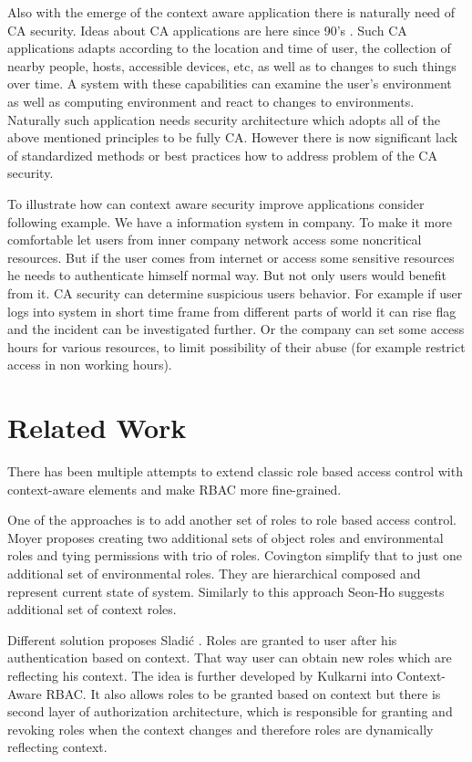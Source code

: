 \documentclass{poster15}
\begin{document}
Also with the emerge of the context aware application there is naturally need of CA security. Ideas about CA applications are here since 90's \cite{contextaware}. Such CA applications adapts according to the location and time of user, the collection of nearby people, hosts, accessible devices, etc, as well as to changes to such things over time. A system with these capabilities can examine the user's environment as well as computing environment and react to changes to environments. Naturally such application needs security architecture which adopts all of the above mentioned principles to be fully CA. However there is now significant lack of standardized methods or best practices how to address problem of the CA security.

To illustrate how can context aware security improve applications consider following example. We have a information system in company. To make it more comfortable let users from inner company network access some noncritical resources. But if the user comes from internet or access some sensitive resources he needs to authenticate himself normal way. But not only users would benefit from it. CA security can determine suspicious users behavior. For example if user logs into system in short time frame from different parts of world it can rise flag and the incident can be investigated further. Or the company can set some access hours for various resources, to limit possibility of their abuse (for example restrict access in non working hours).

\section{Related Work}

There has been multiple attempts to extend classic role based access control with context-aware elements and make RBAC more fine-grained.

One of the approaches is to add another set of roles to role based access control. Moyer \cite{grbac} proposes creating two additional sets of object roles and environmental roles and tying permissions with trio of roles. Covington \cite{envroles} simplify that to just one additional set of environmental roles. They are hierarchical composed and represent current state of system. Similarly to this approach Seon-Ho \cite{contextroles} suggests additional set of context roles.

Different solution proposes Sladi\'c \cite{contextaccess}. Roles are granted to user after his authentication based on context. That way user can obtain new roles which are reflecting his context. The idea is further developed by Kulkarni \cite{contextawarerbac} into Context-Aware RBAC. It also allows roles to be granted based on context but there is second layer of authorization architecture, which is responsible for granting and revoking roles when the context changes and therefore roles are dynamically reflecting context.
\end{document}
